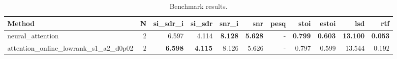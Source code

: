 \begin{table}[t]
\centering
\caption{Benchmark results.}
\label{tab:bench}
\begin{tabular}{lrrrrrrrrrr}
\toprule
Method & N & si\_sdr\_i & si\_sdr & snr\_i & snr & pesq & stoi & estoi & lsd & rtf \\
\midrule
neural_attention & 2 & 6.597 & 4.114 & \textbf{8.128} & \textbf{5.628} & - & \textbf{0.799} & \textbf{0.603} & \textbf{13.100} & \textbf{0.053} \\
attention_online_lowrank_s1_a2_d0p02 & 2 & \textbf{6.598} & \textbf{4.115} & 8.126 & 5.626 & - & 0.797 & 0.599 & 13.544 & 0.192 \\
\bottomrule
\end{tabular}
\end{table}